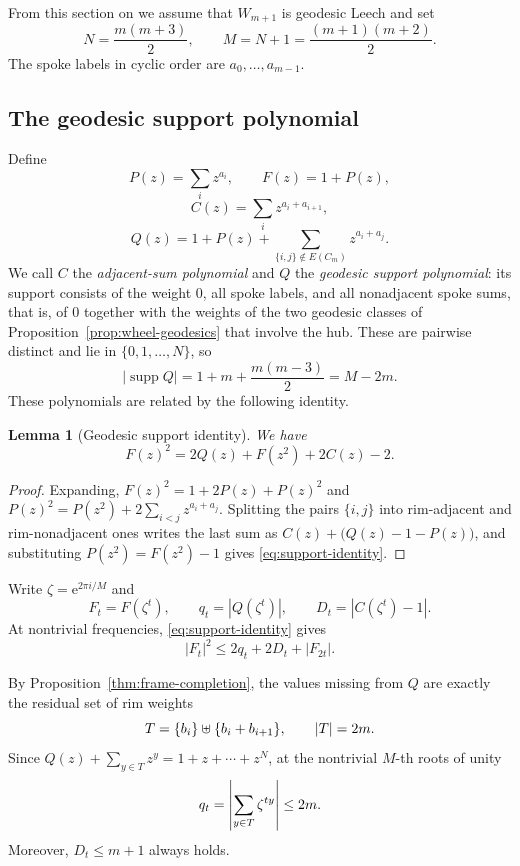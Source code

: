 \documentclass[11pt]{article}
\newtheorem{lemma}[theorem]{Lemma}
\theoremstyle{definition}
\theoremstyle{remark}
\numberwithin{equation}{section}
\newcommand{\dd}{\mathbin{\uplus}}
\DeclarePairedDelimiter{\set}{\{}{\}}
\DeclarePairedDelimiter{\abs}{\lvert}{\rvert}
\newcommand{\e}{\mathrm{e}}
\begin{document}
From this section on we assume that $W_{m+1}$ is geodesic Leech and set
\[
  N=\frac{m(m+3)}2,
  \qquad
  M=N+1=\frac{(m+1)(m+2)}2.
\]
The spoke labels in cyclic order are $a_0,\ldots,a_{m-1}$.

\subsection{The geodesic support polynomial}

Define
\[
  P(z)=\sum_i z^{a_i},
  \qquad
  F(z)=1+P(z),
\]
\[
  C(z)=\sum_i z^{a_i+a_{i+1}},
\]
\[
  Q(z)=1+P(z)+
  \sum_{\{i,j\}\notin E(C_m)}z^{a_i+a_j}.
\]
We call $C$ the \emph{adjacent-sum polynomial} and $Q$ the \emph{geodesic support polynomial}: its support consists of the weight $0$, all spoke labels, and all nonadjacent spoke sums, that is, of $0$ together with the weights of the two geodesic classes of Proposition~\ref{prop:wheel-geodesics} that involve the hub. These are pairwise distinct and lie in $\{0,1,\ldots,N\}$, so
\[
  |\operatorname{supp}Q|
  =1+m+\frac{m(m-3)}2=M-2m.
\]
These polynomials are related by the following identity.

\begin{lemma}[Geodesic support identity]\label{lem:support-identity}
We have
\begin{equation}\label{eq:support-identity}
  F(z)^2=2Q(z)+F(z^2)+2C(z)-2.
\end{equation}
\end{lemma}

\begin{proof}
Expanding, $F(z)^2=1+2P(z)+P(z)^2$ and
$P(z)^2=P(z^2)+2\sum_{i<j}z^{a_i+a_j}$. Splitting the pairs $\{i,j\}$ into
rim-adjacent and rim-nonadjacent ones writes the last sum as
$C(z)+\bigl(Q(z)-1-P(z)\bigr)$, and substituting $P(z^2)=F(z^2)-1$ gives
\eqref{eq:support-identity}.
\end{proof}

Write $\zeta=\e^{2\pi i/M}$ and
\[
  F_t=F(\zeta^t),\qquad
  q_t=|Q(\zeta^t)|,\qquad
  D_t=|C(\zeta^t)-1|.
\]
At nontrivial frequencies, \eqref{eq:support-identity} gives
\begin{equation}\label{eq:F-recursion-main}
  |F_t|^2\le2q_t+2D_t+|F_{2t}|.
\end{equation}

By Proposition~\ref{thm:frame-completion}, the values missing from $Q$ are exactly the residual set of rim weights
\[
  T=\set{b_i}\dd\set{b_i+b_{i+1}},
  \qquad |T|=2m.
\]
Since $Q(z)+\sum_{y\in T}z^y=1+z+\cdots+z^N$, at the nontrivial $M$-th roots of unity
\begin{equation}\label{eq:q-basic}
  q_t=\abs*{\sum_{y\in T}\zeta^{ty}}\le2m.
\end{equation}
Moreover, $D_t\le m+1$ always holds.
\end{document}
